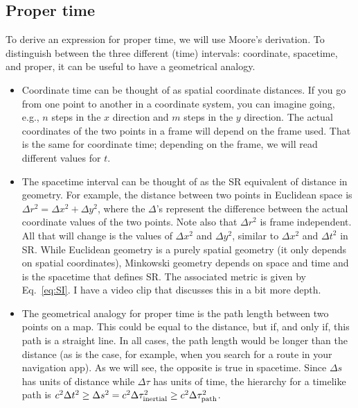 \documentclass[12pt]{article}
\begin{document}
\subsection{Proper time}
To derive an expression for proper time, we will use Moore's derivation. To distinguish between the three different (time) intervals: coordinate, spacetime, and proper, it can be useful to have a geometrical analogy.
\begin{itemize}

\item Coordinate time can be thought of as spatial coordinate distances. If you go from one point to another in a coordinate system, you can imagine going, e.g., $n$ steps in the $x$ direction and $m$ steps in the $y$ direction. The actual coordinates of the two points in a frame will depend on the frame used. That is the same for coordinate time; depending on the frame, we will read different values for $t$.

\item The spacetime interval can be thought of as the SR equivalent of distance in geometry. For example, the distance between two points in Euclidean space is $\Delta r^2 = \Delta x^2 + \Delta y^2$, where the $\Delta$'s represent the difference between the actual coordinate values of the two points. Note also that $\Delta r^2$ is frame independent. All that will change is the values of $\Delta x^2$ and $\Delta y^2$, similar to $\Delta x^2$ and $\Delta t^2$ in SR. While Euclidean geometry is a purely spatial geometry (it only depends on spatial coordinates), Minkowski geometry depends on space and time and is the spacetime that defines SR. The associated metric is given by Eq.~\eqref{eq:SI}. I have a video clip that discusses this in a bit more depth.

\item The geometrical analogy for proper time is the path length between two points on a map. This could be equal to the distance, but if, and only if, this path is a straight line. In all cases, the path length would be longer than the distance (as is the case, for example, when you search for a route in your navigation app). As we will see, the opposite is true in spacetime. Since $\Delta s$ has units of distance while $\Delta \tau$ has units of time, the hierarchy for a timelike path is $c^2\Delta t^2\geq \Delta s^2=c^2\Delta \tau_{\rm inertial}^2\geq c^2\Delta \tau_{\rm path}^2$.
\end{itemize}
\end{document}
